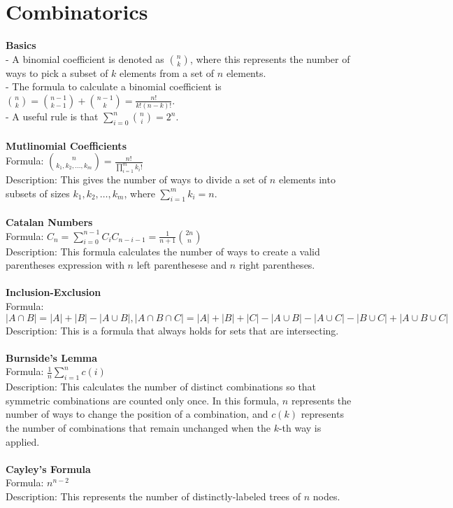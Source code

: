 \documentclass[12pt]{report}
\begin{document}
\section{Combinatorics}
\textbf{Basics}\\
- A binomial coefficient is denoted as \(n\choose{k}\), where this represents the number of ways to pick a subset of \(k\) elements from a set of \(n\) elements.\\
- The formula to calculate a binomial coefficient is \({{n}\choose{k}}={{n - 1}\choose{k - 1}}+{{n - 1}\choose{k}}=\frac{n!}{k!(n - k)!}\).\\
- A useful rule is that \(\sum_{i=0}^{n}{{n}\choose{i}}=2^n\).\\\\
\textbf{Mutlinomial Coefficients}\\
Formula: \({{n}\choose{k_1,k_2,\dots,k_m}}=\frac{n!}{\prod_{i=1}^{m}{{k_i}!}}\)\\
Description: This gives the number of ways to divide a set of \(n\) elements into subsets of sizes \(k_1,k_2,\dots,k_m\), where \(\sum_{i=1}^{m}{k_i}=n\).\\\\
\textbf{Catalan Numbers}\\
Formula: \(C_n=\sum_{i=0}^{n-1}{C_iC_{n-i-1}}=\frac{1}{n+1}{{2n}\choose{n}}\)\\
Description: This formula calculates the number of ways to create a valid parentheses expression with \(n\) left parenthesese and \(n\) right parentheses.\\\\
\textbf{Inclusion-Exclusion}\\
Formula: \(|A\cap{B}|=|A|+|B|-|A\cup{B}|,|A\cap{B}\cap{C}|=|A|+|B|+|C|-|A\cup{B}|-|A\cup{C}|-|B\cup{C}|+|A\cup{B}\cup{C}|\)\\
Description: This is a formula that always holds for sets that are intersecting.\\\\
\textbf{Burnside's Lemma}\\
Formula: \(\frac{1}{n}\sum_{i=1}^{n}{c(i)}\)\\
Description: This calculates the number of distinct combinations so that symmetric combinations are counted only once. In this formula, \(n\) represents the number of ways to change the position of a combination, and \(c(k)\) represents the number of combinations that remain unchanged when the \(k\)-th way is applied.\\\\
\textbf{Cayley's Formula}\\
Formula: \(n^{n - 2}\)\\
Description: This represents the number of distinctly-labeled trees of \(n\) nodes.\\\\
\end{document}
